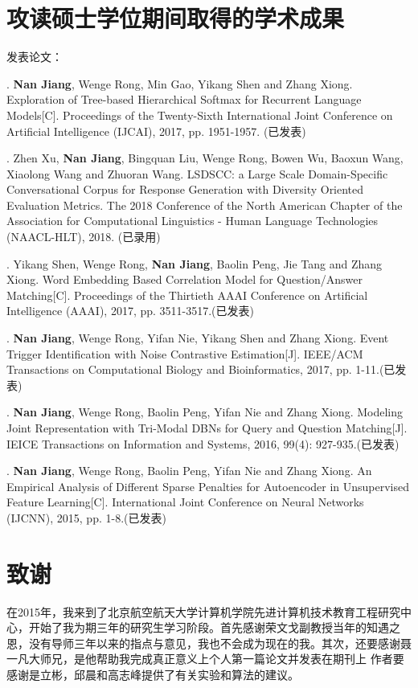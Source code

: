\chapter{攻读硕士学位期间取得的学术成果}
\noindent 发表论文：

. \textbf{Nan Jiang}, Wenge Rong, Min Gao, Yikang Shen and Zhang Xiong. Exploration of Tree-based Hierarchical Softmax for Recurrent Language Models[C]. Proceedings of the Twenty-Sixth International Joint Conference on Artificial Intelligence (IJCAI), 2017, pp. 1951-1957. (已发表)

. Zhen Xu, \textbf{Nan Jiang}, Bingquan Liu, Wenge Rong, Bowen Wu, Baoxun Wang, Xiaolong Wang and Zhuoran Wang. LSDSCC: a Large Scale Domain-Specific Conversational Corpus for Response Generation with Diversity Oriented Evaluation Metrics. The 2018 Conference of the North American Chapter of the Association for Computational Linguistics - Human Language Technologies (NAACL-HLT), 2018. (已录用)

. Yikang Shen, Wenge Rong, \textbf{Nan Jiang}, Baolin Peng, Jie Tang and Zhang Xiong. Word Embedding Based Correlation Model for Question/Answer Matching[C]. Proceedings of the Thirtieth {AAAI} Conference on Artificial Intelligence (AAAI), 2017, pp. 3511-3517.(已发表)

. \textbf{Nan Jiang}, Wenge Rong, Yifan Nie, Yikang Shen and Zhang Xiong. Event Trigger Identification with Noise Contrastive Estimation[J]. IEEE/ACM Transactions on Computational Biology and Bioinformatics, 2017, pp. 1-11.(已发表)

. \textbf{Nan Jiang}, Wenge Rong, Baolin Peng, Yifan Nie and Zhang Xiong. Modeling Joint Representation with Tri-Modal DBNs for Query and Question Matching[J]. IEICE Transactions on Information and Systems, 2016, 99(4): 927-935.(已发表)

. \textbf{Nan Jiang}, Wenge Rong, Baolin Peng, Yifan Nie and Zhang Xiong. An Empirical Analysis of Different Sparse Penalties
for Autoencoder in Unsupervised Feature Learning[C]. International Joint Conference on Neural Networks (IJCNN), 2015, pp. 1-8.(已发表)

\chapter{致\quad 谢}
在2015年，我来到了北京航空航天大学计算机学院先进计算机技术教育工程研究中心，开始了我为期三年的研究生学习阶段。首先感谢荣文戈副教授当年的知遇之恩，没有导师三年以来的指点与意见，我也不会成为现在的我。其次，还要感谢聂一凡大师兄，是他帮助我完成真正意义上个人第一篇论文并发表在期刊上
作者要感谢是立彬，邱晨和高志峰提供了有关实验和算法的建议。